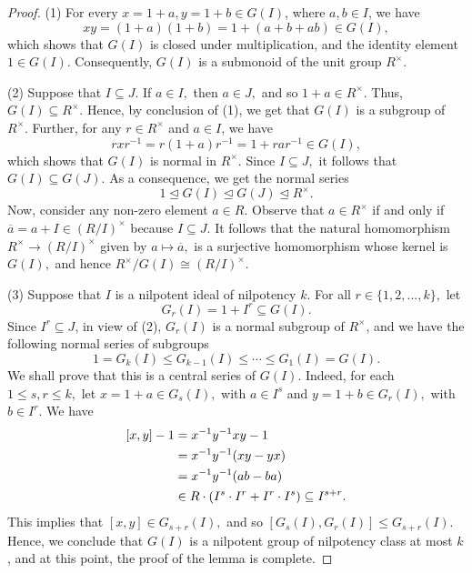 \documentclass[10pt,a4paper]{amsart}
\begin{document}
\begin{proof} (1) For every $x=1+a, y=1+b\in G(I)$, where $a,b\in I$, we have
 $$xy=(1+a)(1+b)=1+(a+b+ab)\in G(I),$$	
which shows that $G(I)$ is closed under multiplication, and the identity element $1\in G(I).$ Consequently, $G(I)$ is a submonoid of the unit group $R^\times.$

(2) Suppose that $I\subseteq J$. If $a\in I,$ then $a\in J,$ and so $1+a\in R^\times.$ Thus, $G(I)\subseteq R^\times.$ Hence, by conclusion of (1), we get that $G(I)$ is a subgroup of $R^\times$. Further, for any $r\in R^\times$ and $a\in I$, we have
$$rxr^{-1}=r(1+a)r^{-1}=1+rar^{-1}\in G(I),$$ which shows that $G(I)$ is normal in $R^\times.$ Since $I\subseteq J,$ it follows that $G(I)\subseteq G(J).$ As a consequence, we get the normal series 
	$$1\trianglelefteq G(I)\trianglelefteq G(J)\trianglelefteq R^\times.$$
Now, consider any non-zero element $a\in R$. Observe that $a\in R^\times$ if and only if $\overline{a}=a+I\in (R/I)^\times$ because $I\subseteq J$. It follows that the natural homomorphism $R^\times\longrightarrow (R/I)^\times$ given by $a\mapsto \overline{a},$ is a surjective homomorphism whose kernel is $G(I),$ and hence $R^\times/G(I)\cong (R/I)^\times.$
		
(3) Suppose that $I$ is a nilpotent ideal of nilpotency $k$. For all $r\in \{1,2,\ldots,k\},$ let $$G_r(I)=1+I^r\subseteq G(I).$$
Since $I^r\subseteq J$, in view of (2), $G_r(I)$ is a normal subgroup of $R^\times$, and we have the following  normal series of subgroups
$$1=G_k(I)\le G_{k-1}(I)\le\cdots\le G_1(I)=G(I).$$
We shall prove that this is a central series of $G(I)$. Indeed, for each $1\leq s, r\leq k,$ let $x=1+a\in G_s(I),$ with $a\in I^s$ and $y=1+b\in G_r(I),$ with $b\in I^r.$ We have
	\begin{gather}
		\begin{split}
			[x,y]-1&=x^{-1}y^{-1}xy-1\\
			&=x^{-1}y^{-1}(xy-yx)\\
			&=x^{-1}y^{-1}(ab-ba)\\
			&\in R\cdot(I^s\cdot I^r+I^r\cdot I^s)\subseteq I^{s+r}.
		\end{split}\notag
	\end{gather}
	This implies that $[x,y]\in G_{s+r}(I),$ and so $[G_s(I),G_r(I)]\le G_{s+r}(I).$ Hence, we conclude that $G(I)$ is a nilpotent group of nilpotency class at most $k$, and at this point,  the proof of the lemma is  complete.
\end{proof}
\end{document}
